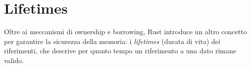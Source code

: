 \section{Lifetimes}
Oltre ai meccanismi di ownership e borrowing, Rust introduce un altro concetto per garantire la sicurezza della memoria: i \textit{lifetimes} (durata di vita) dei riferimenti, che descrive per quanto tempo un riferimento a una dato rimane valido.

